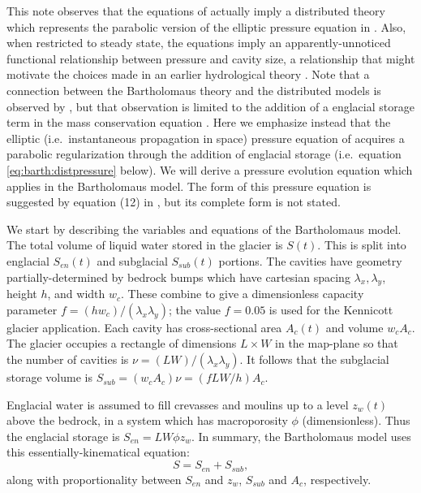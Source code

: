 \documentclass[twocolumn,letterpaper]{igs}
\begin{document}
This note observes that the equations of \cite{Bartholomausetal2011} actually imply a distributed theory which represents the parabolic version of the elliptic pressure equation in \cite{Schoofetal2012}.  Also, when restricted to steady state, the equations imply an apparently-unnoticed functional relationship between pressure and cavity size, a relationship that might motivate the choices made in an earlier hydrological theory \citep{FlowersClarke2002_theory}.  Note that a connection between the Bartholomaus theory and the distributed models is observed by \cite{Hewitt2013}, but that observation is limited to the addition of a englacial storage term in the mass conservation equation \cite[equation (7)]{Hewitt2013}.  Here we emphasize instead that the elliptic (i.e.~instantaneous propagation in space) pressure equation of \cite{Schoofetal2012} acquires a parabolic regularization through the addition of englacial storage (i.e.~equation \eqref{eq:barth:distpressure} below).  We will derive a pressure evolution equation which applies in the Bartholomaus model.  The form of this pressure equation is suggested by equation (12) in \cite{Bartholomausetal2011}, but its complete form is not stated.
 
We start by describing the variables and equations of the Bartholomaus model.  The total volume of liquid water stored in the glacier is $S(t)$.  This is split into englacial $S_{en}(t)$ and subglacial $S_{sub}(t)$ portions.  The cavities have geometry partially-determined by bedrock bumps which have cartesian spacing $\lambda_x,\lambda_y$, height $h$, and width $w_c$.  These combine to give a dimensionless capacity parameter $f=(h w_c)/(\lambda_x \lambda_y)$; the value $f=0.05$ is used for the Kennicott glacier application.  Each cavity has cross-sectional area $A_c(t)$ and volume $w_c A_c$.  The glacier occupies a rectangle of dimensions $L\times W$ in the map-plane so that the number of cavities is $\nu = (LW)/(\lambda_x\lambda_y)$.  It follows that the subglacial storage volume is $S_{sub} = (w_c A_c) \nu = (f L W/h) A_c$.

Englacial water is assumed to fill crevasses and moulins up to a level $z_w(t)$ above the bedrock, in a system which has macroporosity $\phi$ (dimensionless).  Thus the englacial storage is $S_{en}=L W \phi z_w$.  In summary, the Bartholomaus model uses this essentially-kinematical equation:
\begin{equation}
S = S_{en} + S_{sub},  \label{eq:barth:kinematics}
\end{equation}
along with proportionality between $S_{en}$ and $z_w$, $S_{sub}$ and $A_c$, respectively.
 
\end{document}
